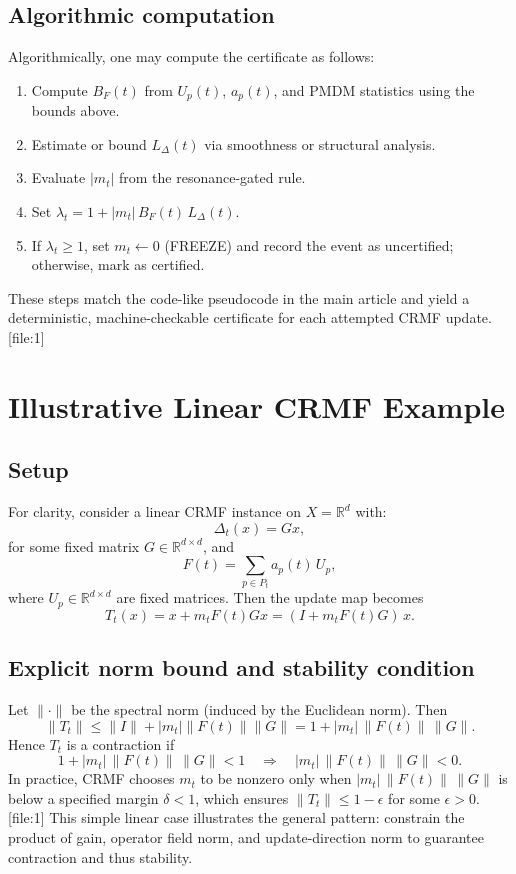 \documentclass[11pt]{article}
\begin{document}
\subsection{Algorithmic computation}

Algorithmically, one may compute the certificate as follows:
\begin{enumerate}
  \item Compute $B_F(t)$ from $U_p(t)$, $a_p(t)$, and PMDM statistics using the bounds above.
  \item Estimate or bound $L_\Delta(t)$ via smoothness or structural analysis.
  \item Evaluate $|m_t|$ from the resonance-gated rule.
  \item Set $\lambda_t = 1 + |m_t|\,B_F(t)\,L_\Delta(t)$.
  \item If $\lambda_t \ge 1$, set $m_t \leftarrow 0$ (FREEZE) and record the event as uncertified; otherwise, mark as certified.
\end{enumerate}
These steps match the code-like pseudocode in the main article and yield a deterministic, machine-checkable certificate for each attempted CRMF update.\,[file:1]

\section{Illustrative Linear CRMF Example}

\subsection{Setup}

For clarity, consider a linear CRMF instance on $X=\mathbb{R}^d$ with:
\[
  \Delta_t(x) = Gx,
\]
for some fixed matrix $G\in\mathbb{R}^{d\times d}$, and
\[
  F(t) = \sum_{p\in P_t} a_p(t)\,U_p,
\]
where $U_p\in\mathbb{R}^{d\times d}$ are fixed matrices.
Then the update map becomes
\[
  T_t(x) = x + m_t F(t) Gx = (I + m_t F(t) G)\,x.
\]

\subsection{Explicit norm bound and stability condition}

Let $\|\cdot\|$ be the spectral norm (induced by the Euclidean norm).
Then
\[
  \|T_t\| \le \|I\| + |m_t|\|F(t)\|\|G\| = 1 + |m_t|\,\|F(t)\|\,\|G\|.
\]
Hence $T_t$ is a contraction if
\[
  1 + |m_t|\,\|F(t)\|\,\|G\| < 1 \quad\Rightarrow\quad |m_t|\,\|F(t)\|\,\|G\| < 0.
\]
In practice, CRMF chooses $m_t$ to be nonzero only when $|m_t|\,\|F(t)\|\,\|G\|$ is below a specified margin $\delta<1$, which ensures $\|T_t\|\le 1-\epsilon$ for some $\epsilon>0$.\,[file:1]
This simple linear case illustrates the general pattern: constrain the product of gain, operator field norm, and update-direction norm to guarantee contraction and thus stability.
\end{document}
